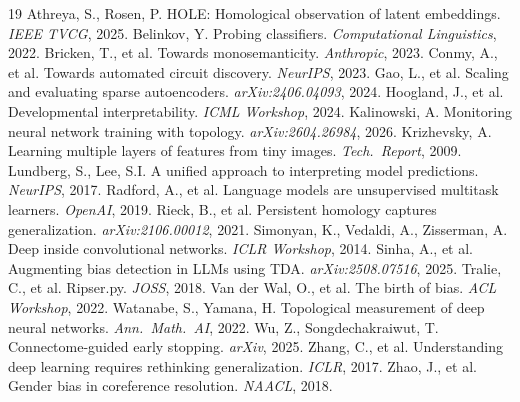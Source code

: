 \documentclass[10pt]{article}
\begin{document}
\begin{thebibliography}{19}
\small
{} Athreya, S., Rosen, P. HOLE: Homological observation of latent embeddings. \emph{IEEE TVCG}, 2025.
 Belinkov, Y. Probing classifiers. \emph{Computational Linguistics}, 2022.
 Bricken, T., et al. Towards monosemanticity. \emph{Anthropic}, 2023.
 Conmy, A., et al. Towards automated circuit discovery. \emph{NeurIPS}, 2023.
 Gao, L., et al. Scaling and evaluating sparse autoencoders. \emph{arXiv:2406.04093}, 2024.
 Hoogland, J., et al. Developmental interpretability. \emph{ICML Workshop}, 2024.
 Kalinowski, A. Monitoring neural network training with topology. \emph{arXiv:2604.26984}, 2026.
 Krizhevsky, A. Learning multiple layers of features from tiny images. \emph{Tech.\ Report}, 2009.
 Lundberg, S., Lee, S.I. A unified approach to interpreting model predictions. \emph{NeurIPS}, 2017.
 Radford, A., et al. Language models are unsupervised multitask learners. \emph{OpenAI}, 2019.
 Rieck, B., et al. Persistent homology captures generalization. \emph{arXiv:2106.00012}, 2021.
 Simonyan, K., Vedaldi, A., Zisserman, A. Deep inside convolutional networks. \emph{ICLR Workshop}, 2014.
 Sinha, A., et al. Augmenting bias detection in LLMs using TDA. \emph{arXiv:2508.07516}, 2025.
 Tralie, C., et al. Ripser.py. \emph{JOSS}, 2018.
 Van der Wal, O., et al. The birth of bias. \emph{ACL Workshop}, 2022.
 Watanabe, S., Yamana, H. Topological measurement of deep neural networks. \emph{Ann.\ Math.\ AI}, 2022.
 Wu, Z., Songdechakraiwut, T. Connectome-guided early stopping. \emph{arXiv}, 2025.
 Zhang, C., et al. Understanding deep learning requires rethinking generalization. \emph{ICLR}, 2017.
 Zhao, J., et al. Gender bias in coreference resolution. \emph{NAACL}, 2018.
\end{thebibliography}
\end{document}

